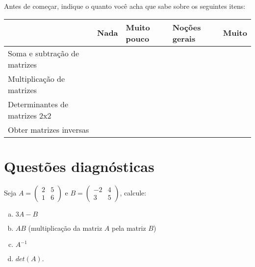 \documentclass[main.tex]{subfiles}
\begin{document}
Antes de começar, indique o quanto você acha que sabe sobre os seguintes itens:

\begin{center}
 \begin{tabular}{|p{25mm}||p{10mm}|p{10mm}|p{10mm}|p{10mm}|} 
 \hline
   & Nada & Muito pouco & Noções gerais & Muito\\
 \hline
 Soma e subtração de matrizes &  &  &  &  \\ 
 \hline
 Multiplicação de matrizes &  &  &  &  \\
 \hline
 Determinantes de matrizes 2x2 &  &  &  &  \\
 \hline
 Obter matrizes inversas &  &  &  &  \\
 \hline
\end{tabular}
\end{center}

\paraAmbos

\section{Questões diagnósticas}

\begin{diagnostico}
Seja $A=\begin{pmatrix}2 & 5 \\ 1 & 6\end{pmatrix}$ e $B=\begin{pmatrix}-2 & 4 \\ 3 & 5\end{pmatrix}$, calcule:
\begin{enumerate}[a)]
  \item $3A-B$
  
  \item $AB$ (multiplicação da matriz $A$ pela matriz $B$)

  \item $A^{-1}$
  
  \item $det(A)$.
\end{enumerate}
\end{diagnostico}
\end{document}
